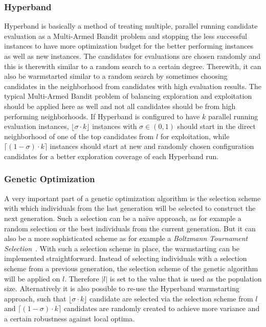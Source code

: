 \subsubsection{Hyperband}
Hyperband is basically a method of treating multiple, parallel running candidate evaluation as a Multi-Armed Bandit problem and stopping the less successful instances to have more optimization budget for the better performing instances as well as new instances.
The candidates for evaluations are chosen randomly and this is therewith similar to a random search to a certain degree.
Therewith, it can also be warmstarted similar to a random search by sometimes choosing candidates in the neighborhood from candidates with high evaluation results.\newline
The typical Multi-Armed Bandit problem of balancing exploration and exploitation should be applied here as well and not all candidates should be from high performing neighborhoods.
If Hyperband is configured to have $k$ parallel running evaluation instances, $\lfloor \sigma \cdot k \rfloor$ instances with $\sigma \in (0,1)$ should start in the direct neighborhood of one of the top candidates from $l$ for exploitation, while $\lceil (1 - \sigma) \cdot k \rceil$ instances should start at new and randomly chosen configuration candidates for a better exploration coverage of each Hyperband run.

\subsubsection{Genetic Optimization}
A very important part of a genetic optimization algorithm is the selection scheme with which individuals from the last generation will be selected to construct the next generation.
Such a selection can be a na\"ive approach, as for example a random selection or the best individuals from the current generation.
But it can also be a more sophisticated scheme as for example a \textit{Boltzmann Tournament Selection}~\cite{Goldberg-Boltzmann}.\newline
With such a selection scheme in place, the warmstarting can be implemented straightforward.
Instead of selecting individuals with a selection scheme from a previous generation, the selection scheme of the genetic algorithm will be applied on $l$.
Therefore $|l|$ is set to the value that is used as the population size.\newline
Alternatively it is also possible to re-use the Hyperband warmstarting approach, such that $\lfloor \sigma \cdot k \rfloor$ candidate are selected via the selection scheme from $l$ and $\lceil (1 - \sigma) \cdot k \rceil$ candidates are randomly created to achieve more variance and a certain robustness against local optima.

